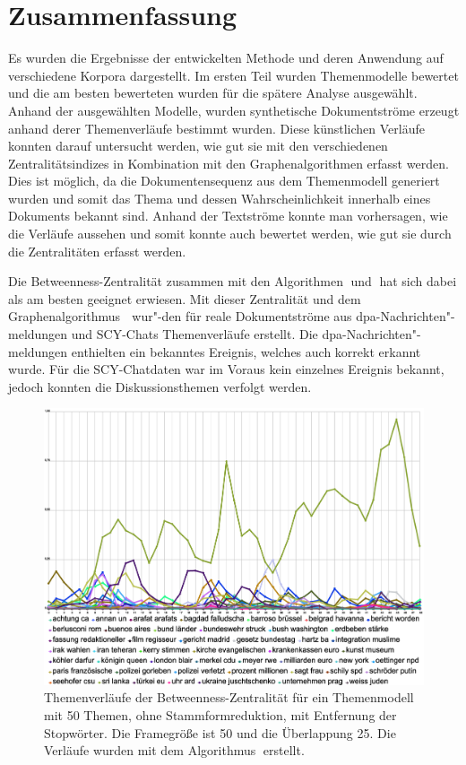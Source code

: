 \section{Zusammenfassung}
Es wurden die Ergebnisse der entwickelten Methode und deren Anwendung auf verschiedene Korpora dargestellt. Im ersten Teil wurden Themenmodelle bewertet und die am besten bewerteten wurden für die spätere Analyse ausgewählt. Anhand der ausgewählten Modelle, wurden synthetische Dokumentströme erzeugt anhand derer Themenverläufe bestimmt wurden. Diese künstlichen Verläufe konnten darauf untersucht werden, wie gut sie mit den verschiedenen Zentralitätsindizes in Kombination mit den Graphenalgorithmen erfasst werden. Dies ist möglich, da die Dokumentensequenz aus dem Themenmodell generiert wurden und somit das Thema und dessen Wahrscheinlichkeit innerhalb eines Dokuments bekannt sind. Anhand der Textströme konnte man vorhersagen, wie die Verläufe aussehen und somit konnte auch bewertet werden, wie gut sie durch die Zentralitäten erfasst werden. 

Die Betweenness-Zentralität zusammen mit den Algorithmen \CDC$\;$und \TPR$\;$hat sich dabei als am besten geeignet erwiesen. Mit dieser Zentralität und dem Graphenalgorithmus \TPR$\;$ wur"-den für reale Dokumentströme aus dpa-Nachrichten"-meldungen und SCY-Chats Themenverläufe erstellt. Die dpa-Nachrichten"-meldungen enthielten ein bekanntes Ereignis, welches auch korrekt erkannt wurde. Für die SCY-Chatdaten war im Voraus kein einzelnes Ereignis bekannt, jedoch konnten die Diskussionsthemen verfolgt werden. 

\begin{figure}[!ht]
\centering
\includegraphics[width=\textwidth, height=0.45\textheight]{images/content/06_results/runs/dpa_f50i25_50nostem_betweenness.eps} 
\caption{Themenverläufe der Betweenness-Zentralität für ein Themenmodell mit 50 Themen, ohne Stammformreduktion, mit Entfernung der Stopwörter. Die Framegröße ist 50 und die Überlappung 25. Die Verläufe wurden mit dem Algorithmus \TPR$\;$erstellt.}
\label{fig:dpa_f50i25_50nostem_tpr_betweenness}
\end{figure}

